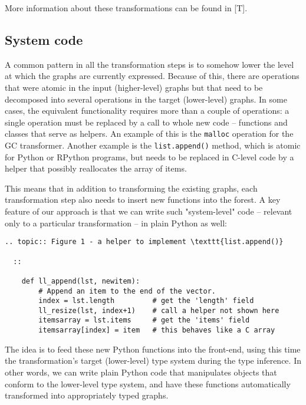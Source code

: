 \documentclass{acm_proc_article-sp}
\begin{document}
More information about these transformations can be found in [T].


\subsection{System code}

A common pattern in all the transformation steps is to somehow lower the
level at which the graphs are currently expressed.  Because of this,
there are operations that were atomic in the input (higher-level) graphs
but that need to be decomposed into several operations in the target
(lower-level) graphs.  In some cases, the equivalent functionality
requires more than a couple of operations: a single operation must be
replaced by a call to whole new code -- functions and classes that serve
as helpers.  An example of this is the \texttt{malloc} operation for the GC
transformer.  Another example is the \texttt{list.append()} method, which is
atomic for Python or RPython programs, but needs to be replaced in
C-level code by a helper that possibly reallocates the array of items.

This means that in addition to transforming the existing graphs, each
transformation step also needs to insert new functions into the forest.
A key feature of our approach is that we can write such "system-level"
code -- relevant only to a particular transformation -- in plain Python
as well:

\begin{verbatim}
.. topic:: Figure 1 - a helper to implement \texttt{list.append()}

  ::

    def ll_append(lst, newitem):
        # Append an item to the end of the vector.
        index = lst.length         # get the 'length' field
        ll_resize(lst, index+1)    # call a helper not shown here
        itemsarray = lst.items     # get the 'items' field
        itemsarray[index] = item   # this behaves like a C array
\end{verbatim}

The idea is to feed these new Python functions into the front-end, using
this time the transformation's target (lower-level) type system during
the type inference.  In other words, we can write plain Python code that
manipulates objects that conform to the lower-level type system, and
have these functions automatically transformed into appropriately typed
graphs.
\end{document}
